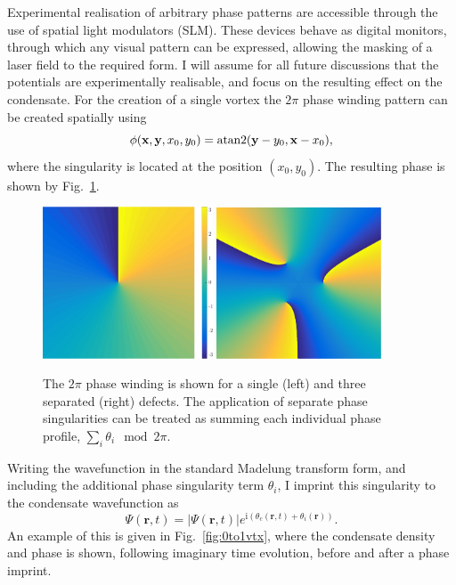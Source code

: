 Experimental realisation of arbitrary phase patterns are accessible through the use of spatial light modulators (SLM). These devices behave as digital monitors, through which any visual pattern can be expressed, allowing the masking of a laser field to the required form. I will assume for all future discussions that the potentials are experimentally realisable, and focus on the resulting effect on the condensate. For the creation of a single vortex the $2\pi$ phase winding pattern can be created spatially using
\begin{equation}
    \phi(\mathbf{x},\mathbf{y},x_0,y_0) = \operatorname*{atan2}(\mathbf{y}-y_0,\mathbf{x}-x_0),
\end{equation}
where the singularity is located at the position $\left(x_0,y_0\right)$. The resulting phase is shown by Fig.~\ref{fig:atan2phase}.
\begin{figure}\centering
    \includegraphics[width=0.45\textwidth]{Images/ch4_vtx/2pi.pdf}
    \includegraphics[width=0.435\textwidth]{Images/ch4_vtx/3_2pi.pdf}
    \caption{The $2\pi$ phase winding is shown for a single (left) and three separated (right) defects. The application of separate phase singularities can be treated as summing each individual phase profile, $\displaystyle\sum\limits_i \theta_i \mod 2\pi$.}\label{fig:atan2phase}
\end{figure}

Writing the wavefunction in the standard Madelung transform form, and including the additional phase singularity term $\theta_i$, I imprint this singularity to the condensate wavefunction as
\begin{equation}
    \Psi(\mathbf{r},t) = |\Psi(\mathbf{r},t)|e^{\text{i}(\theta_c(\mathbf{r},t) + \theta_i(\mathbf{r}))}.
\end{equation}
An example of this is given in Fig.~\ref{fig:0to1vtx}, where the condensate density and phase is shown, following imaginary time evolution, before and after a phase imprint.

